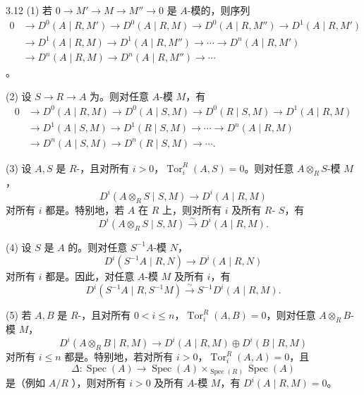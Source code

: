 \begin{SGAresult}{}{3.12}
(1) 若 $0\to M'\to M\to M''\to0$ 是 $A$-模的，则序列
\[
\begin{aligned}
0&\to D^0(A\mid R,M')\to D^0(A\mid R,M)\to D^0(A\mid R,M'')\to D^1(A\mid R,M')\\
&\to D^1(A\mid R,M)\to D^1(A\mid R,M'')\to\cdots\to D^n(A\mid R,M')\\
&\to D^n(A\mid R,M)\to D^n(A\mid R,M'')\to\cdots
\end{aligned}
\]
。

(2) 设 $S\to R\to A$ 为。则对任意 $A$-模 $M$，有
\[
\begin{aligned}
0&\to D^0(A\mid R,M)\to D^0(A\mid S,M)\to D^0(R\mid S,M)\to D^1(A\mid R,M)\\
&\to D^1(A\mid S,M)\to D^1(R\mid S,M)\to\cdots\to D^n(A\mid R,M)\\
&\to D^n(A\mid S,M)\to D^n(R\mid S,M)\to\cdots.
\end{aligned}
\]

(3) 设 $A,S$ 是 $R$-，且对所有 $i>0$，$\operatorname{Tor}_i^R(A,S)=0$。则对任意 $A\otimes_R S$-模 $M$，
\[D^i(A\otimes_R S\mid S,M)\longrightarrow D^i(A\mid R,M)\]
对所有 $i$ 都是。特别地，若 $A$ 在 $R$ 上，则对所有 $i$ 及所有 $R$- $S$，有
\[D^i(A\otimes_R S\mid S,M)\xrightarrow{\sim}D^i(A\mid R,M).\]

(4) 设 $S$ 是 $A$ 的。则对任意 $S^{-1}A$-模 $N$，
\[D^i(S^{-1}A\mid R,N)\longrightarrow D^i(A\mid R,N)\]
对所有 $i$ 都是。因此，对任意 $A$-模 $M$ 及所有 $i$，有
\[D^i(S^{-1}A\mid R,S^{-1}M)\xrightarrow{\sim}S^{-1}D^i(A\mid R,M).\]

(5) 若 $A,B$ 是 $R$-，且对所有 $0<i\leq n$，$\operatorname{Tor}_i^R(A,B)=0$，则对任意 $A\otimes_R B$-模 $M$，
\[D^i(A\otimes_R B\mid R,M)\longrightarrow D^i(A\mid R,M)\oplus D^i(B\mid R,M)\]
对所有 $i\leq n$ 都是。特别地，若对所有 $i>0$，$\operatorname{Tor}_i^R(A,A)=0$，且
\[\Delta:\operatorname{Spec}(A)\longrightarrow\operatorname{Spec}(A)\mathbin{\times_{\operatorname{Spec}(R)}}\operatorname{Spec}(A)\]
是（例如 $A/R$ ），则对所有 $i>0$ 及所有 $A$-模 $M$，有 $D^i(A\mid R,M)=0$。


\end{SGAresult}
